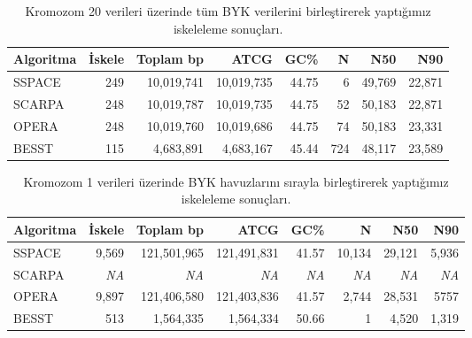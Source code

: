 \documentclass[11pt]{article}
\begin{document}
\begin{table}[htb]
\caption{Kromozom 20 verileri üzerinde tüm BYK verilerini birleştirerek yaptığımız iskeleleme sonuçları.}
\label{tab:chr20w}
\begin{center}
\begin{tabular}{|l|r|r|r|r|r|r|r|}
\hline 
{\bf Algoritma } & {\bf İskele} & {\bf Toplam bp} & {\bf ATCG} & {\bf GC\%} & {\bf N} & {\bf N50} & {\bf N90} \\
\hline
SSPACE & 249	& 10,019,741	& 10,019,735	&  44.75	& 6	& 49,769	& 22,871 \\
SCARPA & 248	& 10,019,787	& 10,019,735	& 44.75	& 52	& 50,183	& 22,871  \\
OPERA  & 248	& 10,019,760	& 10,019,686	& 44.75	& 74	& 50,183	& 23,331 \\
BESST  & 115	& 4,683,891	& 4,683,167	& 45.44	& 724	 & 48,117  	& 23,589 \\
\hline
\end{tabular}
\end{center}
\end{table}


\begin{table}[htb]
\caption{Kromozom 1 verileri üzerinde BYK havuzlarını sırayla birleştirerek yaptığımız iskeleleme sonuçları.}
\label{tab:chr1h}
\begin{center}
\begin{tabular}{|l|r|r|r|r|r|r|r|}
\hline 
{\bf Algoritma } & {\bf İskele} & {\bf Toplam bp} & {\bf ATCG} & {\bf GC\%} & {\bf N} & {\bf N50} & {\bf N90} \\
\hline
SSPACE & 9,569       & 121,501,965        & 121,491,831 & 41.57 & 10,134 & 29,121 & 5,936 \\
SCARPA &  \textit{NA}  &  \textit{NA}     &     \textit{NA}  &   \textit{NA}   &  \textit{NA}    &  \textit{NA}    &  \textit{NA}   \\
OPERA  & 9,897       & 121,406,580        & 121,403,836 & 41.57 & 2,744  & 28,531 & 5757 \\
BESST  & 513 & 1,564,335          & 1,564,334   & 50.66 & 1     & 4,520  & 1,319 \\ 
\hline
\end{tabular}
\end{center}
\end{table}
\end{document}
